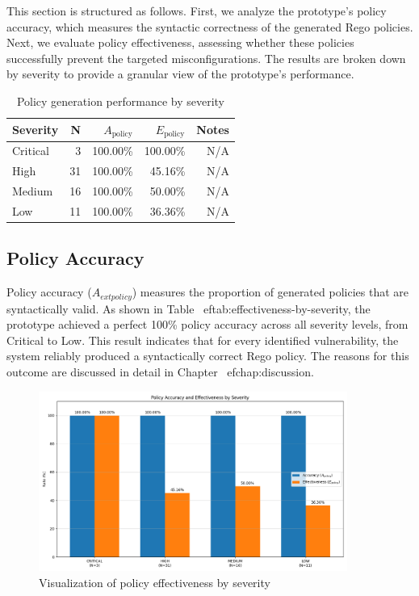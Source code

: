 This section is structured as follows. First, we analyze the prototype's policy accuracy, which measures the syntactic correctness of the generated Rego policies. Next, we evaluate policy effectiveness, assessing whether these policies successfully prevent the targeted misconfigurations. The results are broken down by severity to provide a granular view of the prototype's performance.

\begin{table}[htbp]
	\centering
		\caption{Policy generation performance by severity}\label{tab:effectiveness-by-severity}
	\begin{tabular}{lrrrr}
		\hline
		Severity & N & $A_{\text{policy}}$ & $E_{\text{policy}}$ & Notes \\
		\hline
		Critical & 3 & 100.00\% & 100.00\% & N/A \\
		High & 31 & 100.00\% & 45.16\% & N/A \\
		Medium & 16 & 100.00\% & 50.00\% & N/A \\
		Low & 11 & 100.00\% & 36.36\% & N/A \\
		\hline
	\end{tabular}
\end{table}

\subsection{Policy Accuracy}
Policy accuracy ($A_{	ext{policy}}$) measures the proportion of generated policies that are syntactically valid. As shown in Table~
ef{tab:effectiveness-by-severity}, the prototype achieved a perfect 100\% policy accuracy across all severity levels, from Critical to Low. This result indicates that for every identified vulnerability, the system reliably produced a syntactically correct Rego policy. The reasons for this outcome are discussed in detail in Chapter~
ef{chap:discussion}.

\begin{figure}[htbp]
	\centering
	\includegraphics[width=0.9\textwidth]{Figures/effectiveness_by_severity.png}
	\caption{Visualization of policy effectiveness by severity}\label{fig:effectiveness-plot}
\end{figure}

